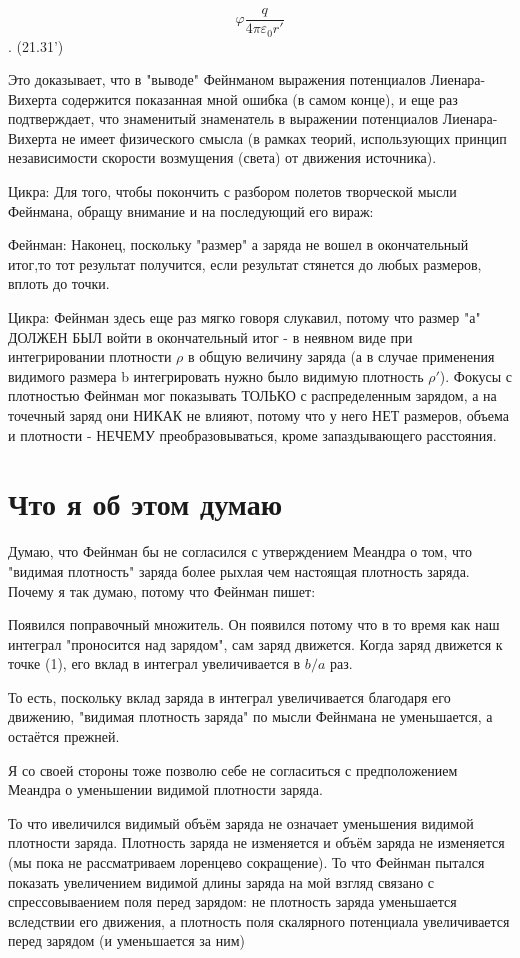 \documentclass{article}
\begin{document}
$$\varphi\frac{q}{4\pi\varepsilon_0 r'}$$  .   (21.31')

Это доказывает, что в "выводе" Фейнманом выражения потенциалов Лиенара-Вихерта содержится показанная мной ошибка (в самом конце), и еще раз подтверждает, что знаменитый знаменатель в выражении потенциалов Лиенара-Вихерта не имеет физического смысла (в рамках теорий, использующих принцип независимости скорости возмущения (света) от движения источника).

Цикра:
Для того, чтобы покончить с разбором полетов творческой мысли Фейнмана, обращу внимание и на последующий его вираж:

Фейнман:
Наконец, поскольку "размер" а заряда не вошел в окончательный итог,то тот результат получится, если результат стянется до любых размеров, вплоть до точки.

Цикра:
Фейнман здесь еще раз мягко говоря слукавил, потому что размер "а" ДОЛЖЕН БЫЛ войти в окончательный итог - в неявном виде при интегрировании плотности $\rho$ в общую величину заряда (а в случае применения видимого размера b интегрировать нужно было видимую плотность $\rho'$).
Фокусы с плотностью Фейнман мог показывать ТОЛЬКО с распределенным зарядом, а на точечный заряд они НИКАК не влияют, потому что у него НЕТ размеров, объема и плотности - НЕЧЕМУ преобразовываться, кроме запаздывающего расстояния.

\section{Что я об этом думаю}

Думаю, что Фейнман бы не согласился с утверждением Меандра о том, что "видимая плотность" заряда более рыхлая чем настоящая плотность заряда. Почему я так думаю, потому что Фейнман пишет:

Появился поправочный множитель. Он появился потому что в то время как наш интеграл "проносится над зарядом", сам заряд движется. Когда заряд движется к точке (1), его вклад в интеграл увеличивается в $b/a$ раз.

То есть, поскольку вклад заряда в интеграл увеличивается благодаря его движению, "видимая плотность заряда" по мысли Фейнмана не уменьшается, а остаётся прежней. 

Я со своей стороны тоже позволю себе не согласиться с предположением Меандра о уменьшении видимой плотности заряда. 

То что ивеличился видимый объём заряда не означает уменьшения видимой плотности заряда. Плотность заряда не изменяется и объём заряда не изменяется (мы пока не рассматриваем лоренцево сокращение). То что Фейнман пытался показать увеличением видимой длины заряда на мой взгляд связано с спрессовываением поля перед зарядом: не плотность заряда уменьшается вследствии его движения, а плотность поля скалярного потенциала увеличивается перед зарядом (и уменьшается за ним)
\end{document}
